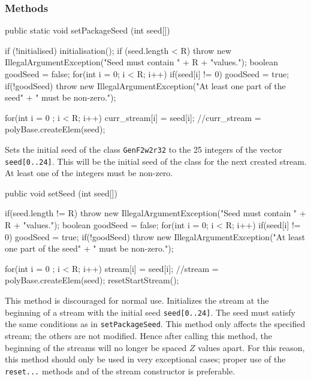 \subsubsection* {Methods}
\begin{code}
   public static void setPackageSeed (int seed[]) \begin{hide} {
      if (!initialised)
         initialisation();
      if (seed.length < R)
         throw new IllegalArgumentException("Seed must contain " + R +
                                            "values.");
      boolean goodSeed = false;
      for(int i = 0; i < R; i++)
         if(seed[i] != 0)
            goodSeed = true;
      if(!goodSeed)
         throw new IllegalArgumentException("At least one part of the seed" +
                                            " must be non-zero.");

      for(int i = 0 ; i < R; i++)
         curr_stream[i] = seed[i];
      //curr_stream = polyBase.createElem(seed);
   } \end{hide}
\end{code}
\begin{tabb} Sets the initial seed of the class \texttt{GenF2w2r32} to the 25
  integers of the vector \texttt{seed[0..24]}.
  This will be the initial seed of the class for the next created stream.
  At least one of the integers must be non-zero.
\end{tabb}
\begin{htmlonly}
\end{htmlonly}
\begin{code}

   public void setSeed (int seed[]) \begin{hide} {
      if(seed.length != R)
         throw new IllegalArgumentException("Seed must contain " + R +
                                            "values.");
      boolean goodSeed = false;
      for(int i = 0; i < R; i++)
         if(seed[i] != 0)
            goodSeed = true;
      if(!goodSeed)
         throw new IllegalArgumentException("At least one part of the seed" +
                                            " must be non-zero.");

      for(int i = 0 ; i < R; i++)
         stream[i] = seed[i];
      //stream = polyBase.createElem(seed);
      resetStartStream();
   } \end{hide}
\end{code}
\begin{tabb} This method is discouraged for normal use.
  Initializes the stream at the beginning of a stream with the initial
  seed \texttt{seed[0..24]}. The seed must satisfy the same conditions as in
  \texttt{setPackageSeed}.
  This method only affects the specified stream; the others are not modified.
  Hence after calling this method, the beginning of the streams will no
  longer be spaced $Z$ values apart.
  For this reason, this method should only be used in very exceptional cases;
  proper use of the \texttt{reset...} methods and of the stream constructor
  is preferable.
\end{tabb}
